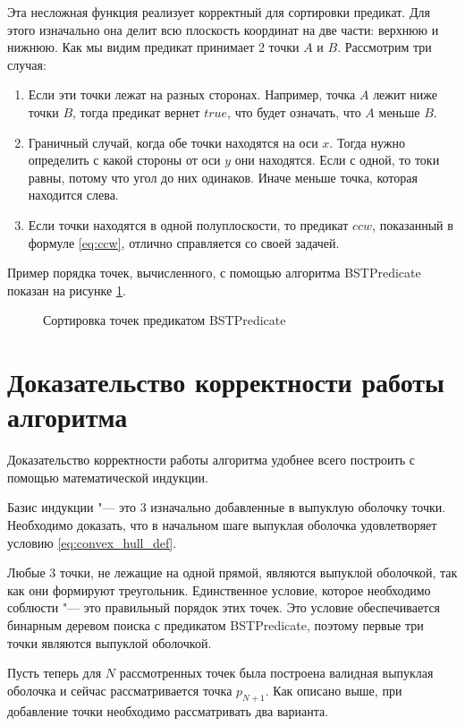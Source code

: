 Эта несложная функция реализует корректный для сортировки предикат. Для этого изначально она делит всю плоскость координат на две части: верхнюю и нижнюю. Как мы видим предикат принимает 2 точки $A$ и $B$. Рассмотрим три случая:
\begin{enumerate}
	\item Если эти точки лежат на разных сторонах. Например, точка $A$ лежит ниже точки $B$, тогда предикат вернет $true$, что будет означать, что $A$ меньше $B$.
	\item Граничный случай, когда обе точки находятся на оси $x$. Тогда нужно определить с какой стороны от оси $y$ они находятся. Если с одной, то токи равны, потому что угол до них одинаков. Иначе меньше точка, которая находится слева.
	\item Если точки находятся в одной полуплоскости, то предикат $ccw$, показанный в формуле \eqref{eq:ccw}, отлично справляется со своей задачей.
\end{enumerate}

Пример порядка точек, вычисленного, с помощью алгоритма BSTPredicate показан на рисунке \ref{img:BSTPred_ordering}.

\begin{figure}[hbt]
	\centering
	
	\caption{Сортировка точек предикатом BSTPredicate}
	\label{img:BSTPred_ordering}
\end{figure}

\section{Доказательство корректности работы алгоритма} \label{subsect2_3}

Доказательство корректности работы алгоритма удобнее всего построить с помощью математической индукции.

Базис индукции "--- это 3 изначально добавленные в выпуклую оболочку точки. Необходимо доказать, что в начальном шаге выпуклая оболочка удовлетворяет условию \eqref{eq:convex_hull_def}.

Любые 3 точки, не лежащие на одной прямой, являются выпуклой оболочкой, так как они формируют треугольник. Единственное условие, которое необходимо соблюсти "--- это правильный порядок этих точек. Это условие обеспечивается бинарным деревом поиска с предикатом BSTPredicate, поэтому первые три точки являются выпуклой оболочкой.

Пусть теперь для $N$ рассмотренных точек была построена валидная выпуклая оболочка и сейчас рассматривается точка $p_{N+1}$. Как описано выше, при добавление точки необходимо рассматривать два варианта.

